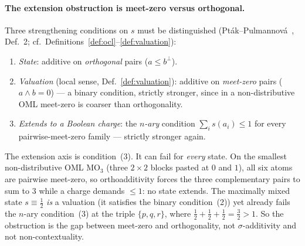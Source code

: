 \documentclass[11pt]{article}
\theoremstyle{definition}
\begin{document}
\paragraph{The extension obstruction is meet-zero versus orthogonal.}
Three strengthening conditions on $s$ must be distinguished
(Pt\'{a}k--Pulmannov\'{a}~\cite{PtakPulmannova1994}, Def.~2; cf.\
Definitions~\ref{def:ocl}--\ref{def:valuation}):
\begin{enumerate}[label=(\arabic*), noitemsep]
  \item \emph{State}: additive on \emph{orthogonal} pairs
    ($a \leq b^\perp$).
  \item \emph{Valuation} (local sense, Def.~\ref{def:valuation}):
    additive on \emph{meet-zero} pairs
    ($a \wedge b = 0$) --- a binary condition, strictly stronger,
    since in a non-distributive OML meet-zero is coarser than
    orthogonality.
  \item \emph{Extends to a Boolean charge}: the \emph{$n$-ary}
    condition $\sum_i s(a_i) \leq 1$ for every pairwise-meet-zero
    family --- strictly stronger again.
\end{enumerate}
The extension axis is condition~(3).  It can fail for \emph{every}
state.  On the smallest non-distributive OML $\mathrm{MO}_3$ (three
$2{\times}2$ blocks pasted at $0$ and $1$), all six atoms are
pairwise meet-zero, so orthoadditivity forces the three
complementary pairs to sum to $3$ while a charge demands
$\leq 1$: no state extends.  The maximally mixed state
$s \equiv \tfrac{1}{2}$ \emph{is} a valuation (it satisfies the
binary condition~(2)) yet already fails the $n$-ary
condition~(3) at the triple $\{p, q, r\}$, where
$\tfrac{1}{2} + \tfrac{1}{2} + \tfrac{1}{2} = \tfrac{3}{2} > 1$.
So the obstruction is the gap between meet-zero and orthogonality,
not $\sigma$-additivity and not non-contextuality.
\end{document}
